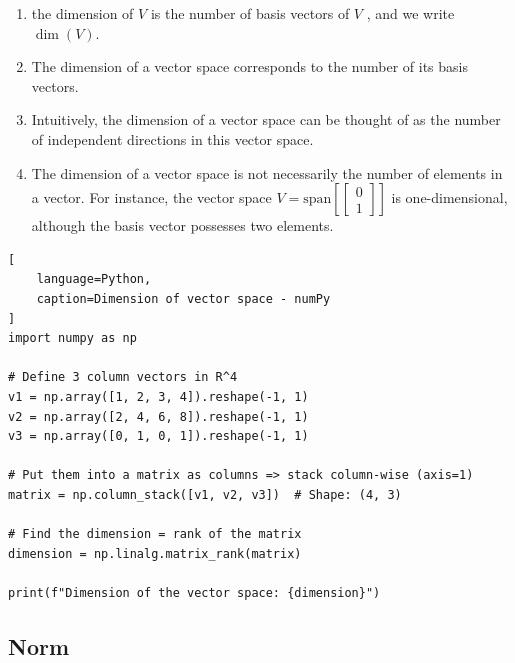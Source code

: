 \begin{enumerate}
    \item the dimension of $V$ is the number of basis vectors of $V$ , and we write $\dim(V)$.
    \hfill \cite{mfml/book/mml/Deisenroth-Faisal-Ong}

    \item The dimension of a vector space corresponds to the number of its basis vectors.
    \hfill \cite{mfml/book/mml/Deisenroth-Faisal-Ong}

    \item Intuitively, the dimension of a vector space can be thought of as the number of independent directions in this vector space.
    \hfill \cite{mfml/book/mml/Deisenroth-Faisal-Ong}

    \item The dimension of a vector space is not necessarily the number of elements in a vector.
    For instance, the vector space $V = \text{span}[\begin{bmatrix}0 \\ 1\end{bmatrix}]$ is one-dimensional, although the basis vector possesses two elements.
    \hfill \cite{mfml/book/mml/Deisenroth-Faisal-Ong}
\end{enumerate}


\begin{lstlisting}[
    language=Python,
    caption=Dimension of vector space - numPy
]
import numpy as np

# Define 3 column vectors in R^4
v1 = np.array([1, 2, 3, 4]).reshape(-1, 1)
v2 = np.array([2, 4, 6, 8]).reshape(-1, 1)
v3 = np.array([0, 1, 0, 1]).reshape(-1, 1)

# Put them into a matrix as columns => stack column-wise (axis=1)
matrix = np.column_stack([v1, v2, v3])  # Shape: (4, 3)

# Find the dimension = rank of the matrix
dimension = np.linalg.matrix_rank(matrix)

print(f"Dimension of the vector space: {dimension}")
\end{lstlisting}












\subsection{Norm}

